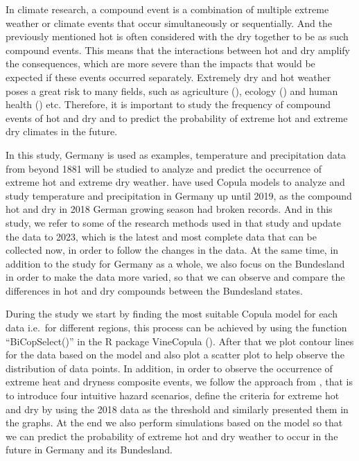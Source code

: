 \documentclass[
]{krantz}
\begin{document}
In climate research, a compound event is a combination of multiple extreme weather or climate events that occur simultaneously or sequentially. And the previously mentioned hot is often considered with the dry together to be as such compound events. This means that the interactions between hot and dry amplify the consequences, which are more severe than the impacts that would be expected if these events occurred separately. Extremely dry and hot weather poses a great risk to many fields, such as agriculture (\citet{lesk2016}), ecology (\citet{jentsch2008}) and human health (\citet{libonati2022}) etc. Therefore, it is important to study the frequency of compound events of hot and dry and to predict the probability of extreme hot and extreme dry climates in the future.

In this study, Germany is used as examples, temperature and precipitation data from beyond 1881 will be studied to analyze and predict the occurrence of extreme hot and extreme dry weather. \citet{zscheischler2020} have used Copula models to analyze and study temperature and precipitation in Germany up until 2019, as the compound hot and dry in 2018 German growing season had broken records. And in this study, we refer to some of the research methods used in that study and update the data to 2023, which is the latest and most complete data that can be collected now, in order to follow the changes in the data. At the same time, in addition to the study for Germany as a whole, we also focus on the Bundesland in order to make the data more varied, so that we can observe and compare the differences in hot and dry compounds between the Bundesland states.

During the study we start by finding the most suitable Copula model for each data i.e.~for different regions, this process can be achieved by using the function ``BiCopSelect()'' in the R package VineCopula (\citet{schepsmeier2018}). After that we plot contour lines for the data based on the model and also plot a scatter plot to help observe the distribution of data points. In addition, in order to observe the occurrence of extreme heat and dryness composite events, we follow the approach from \citet{zscheischler2020}, that is to introduce four intuitive hazard scenarios, define the criteria for extreme hot and dry by using the 2018 data as the threshold and similarly presented them in the graphs. At the end we also perform simulations based on the model so that we can predict the probability of extreme hot and dry weather to occur in the future in Germany and its Bundesland.
\end{document}
